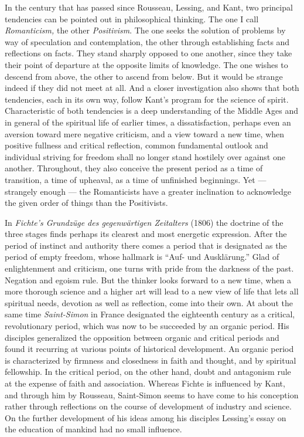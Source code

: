 \documentclass[12pt,a4paper,openany]{book}
\newcommand{\opage}[1]{\marginnote{\footnotesize\textit{[#1]}}}
\begin{document}
In the century that has passed since Rousseau, Lessing,
and Kant, two principal tendencies can be pointed out in philosophical
thinking. The one I call \emph{Romanticism,} the other
\emph{Positivism}. The one seeks the solution of problems by way of
speculation and contemplation, the other through
establishing facts and reflections on
facts. They stand sharply opposed to one another, since they take their
point of departure at the opposite limits of knowledge.
The one wishes to descend from above, the other to ascend from below. But
\opage{234}it would be strange indeed if they did not meet at all. And
a closer investigation also shows that both
tendencies, each in its own way, follow Kant's program for the
science of spirit. Characteristic of both tendencies is a deep
understanding of the Middle Ages and in general of the spiritual life
of earlier times, a dissatisfaction, perhaps even an aversion toward
mere negative criticism, and a view toward a new time, when
positive fullness and critical reflection, common fundamental outlook and
individual striving for freedom shall no longer stand hostilely
over against one another. Throughout, they also conceive
the present period as a time of transition, a
time of upheaval, as a time of unfinished beginnings. Yet
--- strangely enough --- the Romanticists have a greater inclination
to acknowledge the given order of things than
the Positivists.

In \emph{Fichte's Grundzüge des gegenwärtigen Zeitalters} (1806)
the doctrine of the three stages finds perhaps its clearest and most
energetic expression. After the period of instinct and authority
there comes a period that is designated as the period of empty freedom,
whose hallmark is ``Auf- und Ausklärung.''
Glad of enlightenment and criticism, one turns with pride
from the darkness of the past. Negation and egoism rule. But
the thinker looks forward to a new time, when a more thorough
science and a higher art will lead to a new view of life
that lets all spiritual needs, devotion as well
as reflection, come into their own. At about the same time
\emph{Saint-Simon} in France designated the eighteenth century as
a critical, revolutionary period, which was now to be succeeded by an
organic period. His disciples generalized the
opposition between organic and critical periods and found it
recurring at various points of historical
development. An organic period is characterized by firmness and
closedness in faith and thought, and by spiritual fellowship. In
the critical period, on the other hand, doubt and antagonism rule
at the expense of faith and association. Whereas Fichte is
influenced by Kant, and through him by Rousseau, Saint-Simon
seems to have come to his conception rather through
reflections on the
\opage{235}course of development of industry and science. On the further development of his ideas among his
disciples Lessing's essay on the education of mankind had
no small influence.
\end{document}
